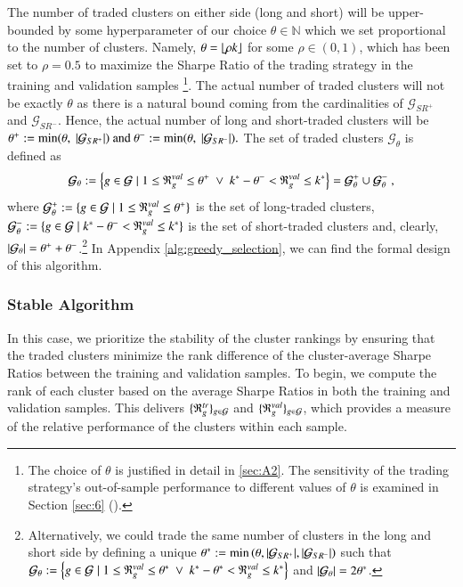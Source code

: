 \mx
The number of traded clusters on either side (long and short) will be upper-bounded by some hyperparameter of our choice $\theta \in \mathbb{N}$
which we set proportional to the number of clusters. Namely, $\theta =\lfloor \rho k \rfloor$ for some $\rho\in(0,1)$, which has been set to $\rho=0.5$ to maximize the Sharpe Ratio of the trading strategy in the training and validation samples
\footnote{ The choice of $\theta$ is justified in detail in \ref{sec:A2}. The sensitivity of the trading strategy's out-of-sample performance to different values of $\theta$ is examined in Section \ref{sec:6} ().}.
%
The actual number of traded clusters will not be exactly $\theta$ as there is a natural bound coming from the cardinalities of $\mathcal G_{SR^+}$ and $\mathcal G_{SR^-}$. Hence, the actual number of long and short-traded clusters will be
$
\theta^+ := \min(\theta, ~|\mathcal G_{SR^+}|)
~\text{and}~
\theta^- := \min(\theta, ~|\mathcal G_{SR^-}|)
.
$
The set of traded clusters $\mathcal G_{\theta}$ is defined as
$$
\mathcal{G}_\theta := 
\left\{
g \in \mathcal G 
\mid 
1\leq \mathfrak{R}_g^{val} \leq \theta^+
~\vee~ 
k^* -\theta^- < \mathfrak{R}_g^{val} \leq k^*
\right\} 
= 
\mathcal{G}_{\theta}^+ \cup \mathcal{G}_{\theta}^-
~,
$$
where
$
\mathcal{G}_{\theta}^+ := 
\{ g \in\mathcal{G} \mid 
1\leq \mathfrak{R}_g^{val} \leq \theta^+
\}
$
is the set of long-traded clusters,
$
\mathcal{G}_{\theta}^- := 
\{ g \in\mathcal{G} \mid 
k^*-\theta^-
< \mathfrak{R}_g^{val} \leq 
k^*
\}
$
is the set of short-traded clusters 
and, clearly, $\left|\mathcal{G}_{\theta}\right|=\theta^+ + \theta^- $.\footnote{
Alternatively, we could trade the same number of clusters in the long and short side by defining a unique 
$
\theta^* := \min\left(\theta, |\mathcal G_{SR^+}|, |\mathcal G_{SR^-}| \right)
$
such that
$
\mathcal{G}_\theta := 
\left\{
g \in \mathcal G 
\mid 
1\leq \mathfrak{R}_g^{val} \leq \theta^*
~\vee~ 
k^*-\theta^* < \mathfrak{R}_g^{val} \leq k^*
\right\} 
$
and 
$\left|\mathcal{G}_\theta\right|=2\theta^*$.
}
In Appendix \cref{alg:greedy_selection}, we can find the formal design of this algorithm.

\subsubsection{Stable Algorithm}

In this case, we prioritize the stability of the cluster rankings by ensuring that the traded clusters minimize the rank difference of the cluster-average Sharpe Ratios between the training and validation samples. 
To begin, we compute the rank of each cluster based on the average Sharpe Ratios in both the training and validation samples. This delivers $\{\mathfrak{R}_g^{tr}\}_{g\in\mathcal{G}}$ and $\{\mathfrak{R}_g^{val}\}_{g\in\mathcal{G}}$, which provides a measure of the relative performance of the clusters within each sample.

